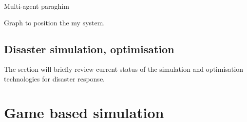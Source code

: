 Multi-agent paraghim 


Graph to position the my system. 

\subsection{Disaster simulation, optimisation}
The section will briefly review current status of the simulation and optimisation technologies for disaster response.


\section{Game based simulation} \label{sec:LRMRgame}




